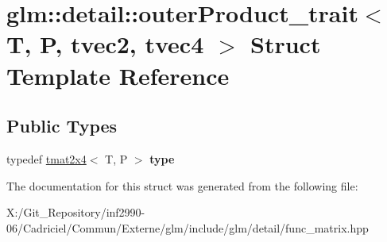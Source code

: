 \hypertarget{structglm_1_1detail_1_1outer_product__trait_3_01_t_00_01_p_00_01tvec2_00_01tvec4_01_4}{\section{glm\-:\-:detail\-:\-:outer\-Product\-\_\-trait$<$ T, P, tvec2, tvec4 $>$ Struct Template Reference}
\label{structglm_1_1detail_1_1outer_product__trait_3_01_t_00_01_p_00_01tvec2_00_01tvec4_01_4}
}
\subsection*{Public Types}
\begin{DoxyCompactItemize}
\item 
\hypertarget{structglm_1_1detail_1_1outer_product__trait_3_01_t_00_01_p_00_01tvec2_00_01tvec4_01_4_a5ca49ab58d1c30d858b622c06147cd57}{typedef \hyperlink{structglm_1_1detail_1_1tmat2x4}{tmat2x4}$<$ T, P $>$ {\bfseries type}}\label{structglm_1_1detail_1_1outer_product__trait_3_01_t_00_01_p_00_01tvec2_00_01tvec4_01_4_a5ca49ab58d1c30d858b622c06147cd57}

\end{DoxyCompactItemize}


The documentation for this struct was generated from the following file\-:\begin{DoxyCompactItemize}
\item 
X\-:/\-Git\-\_\-\-Repository/inf2990-\/06/\-Cadriciel/\-Commun/\-Externe/glm/include/glm/detail/func\-\_\-matrix.\-hpp\end{DoxyCompactItemize}
